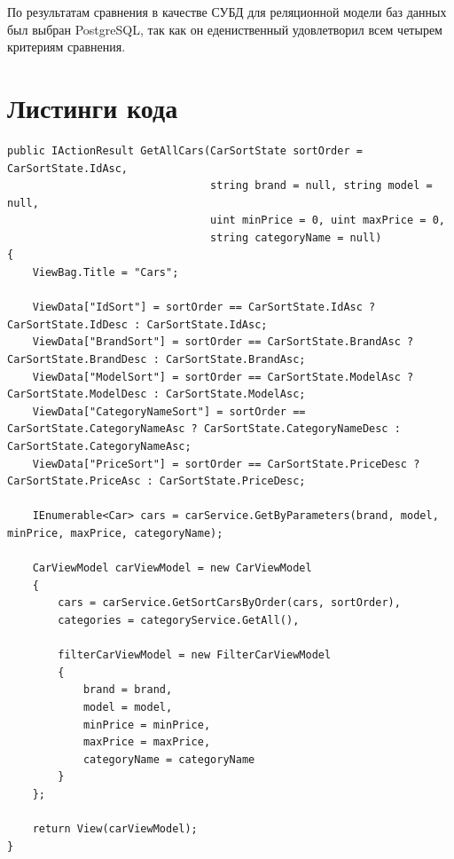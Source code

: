 \documentclass[a4paper,14pt, unknownkeysallowed]{extreport}
\begin{document}
По результатам сравнения в качестве СУБД для реляционной модели баз данных был выбран PostgreSQL, так как он едениственный удовлетворил всем четырем критериям сравнения.

\clearpage

\section{Листинги кода}

\begin{center}
\captionsetup{justification=raggedright,singlelinecheck=off}
\begin{lstlisting}[label=lst:GetAllCars,caption=Функция вывода всех автомобилей]
public IActionResult GetAllCars(CarSortState sortOrder = CarSortState.IdAsc,
								string brand = null, string model = null,
								uint minPrice = 0, uint maxPrice = 0, 
								string categoryName = null)
{
	ViewBag.Title = "Cars";

	ViewData["IdSort"] = sortOrder == CarSortState.IdAsc ? CarSortState.IdDesc : CarSortState.IdAsc;
	ViewData["BrandSort"] = sortOrder == CarSortState.BrandAsc ? CarSortState.BrandDesc : CarSortState.BrandAsc;
	ViewData["ModelSort"] = sortOrder == CarSortState.ModelAsc ? CarSortState.ModelDesc : CarSortState.ModelAsc;
	ViewData["CategoryNameSort"] = sortOrder == CarSortState.CategoryNameAsc ? CarSortState.CategoryNameDesc : CarSortState.CategoryNameAsc;
	ViewData["PriceSort"] = sortOrder == CarSortState.PriceDesc ? CarSortState.PriceAsc : CarSortState.PriceDesc;

	IEnumerable<Car> cars = carService.GetByParameters(brand, model, minPrice, maxPrice, categoryName);

	CarViewModel carViewModel = new CarViewModel
	{
		cars = carService.GetSortCarsByOrder(cars, sortOrder),
		categories = categoryService.GetAll(),

		filterCarViewModel = new FilterCarViewModel
		{
			brand = brand,
			model = model,
			minPrice = minPrice,
			maxPrice = maxPrice,
			categoryName = categoryName
		}
	};

	return View(carViewModel);
}
\end{lstlisting}
\end{center}

\clearpage
\end{document}
